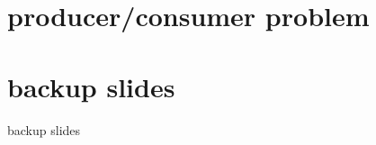 

\section{producer/consumer problem}








\section{backup slides}
\begin{frame}{backup slides}
\end{frame}




